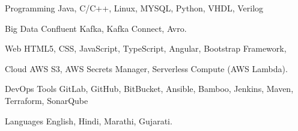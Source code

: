 \vspace{-1.75mm}


\begin{cvskills}


\cvskill
{Programming} %
{Java, C/C++, Linux, MYSQL, Python, VHDL, Verilog} %


\cvskill
{Big Data} %
{Confluent Kafka, Kafka Connect, Avro.} %

\cvskill
{Web} %
{HTML5, CSS, JavaScript, TypeScript, Angular, Bootstrap Framework,} %

\cvskill
{Cloud} %
{AWS S3, AWS Secrets Manager, Serverless Compute (AWS Lambda).} %


\cvskill
{DevOps Tools} %
{GitLab, GitHub, BitBucket, Ansible, Bamboo, Jenkins, Maven, Terraform, SonarQube } %

\cvskill
{Languages} %
{English, Hindi, Marathi, Gujarati.} %


\end{cvskills}